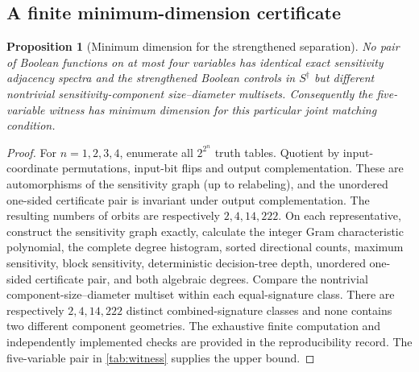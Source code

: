 \documentclass[twoside,12pt,letterpaper]{article}
\newtheorem{proposition}{Proposition}
\theoremstyle{definition}
\begin{document}
\subsection{A finite minimum-dimension certificate}
\begin{proposition}[Minimum dimension for the strengthened separation]\label{prop:minimal}
No pair of Boolean functions on at most four variables has identical exact sensitivity adjacency spectra and the strengthened Boolean controls in $S^\dagger$ but different nontrivial sensitivity-component size--diameter multisets. Consequently the five-variable witness has minimum dimension for this particular joint matching condition.
\end{proposition}
\begin{proof}
For $n=1,2,3,4$, enumerate all $2^{2^n}$ truth tables. Quotient by input-coordinate permutations, input-bit flips and output complementation. These are automorphisms of the sensitivity graph (up to relabeling), and the unordered one-sided certificate pair is invariant under output complementation. The resulting numbers of orbits are respectively $2,4,14,222$. On each representative, construct the sensitivity graph exactly, calculate the integer Gram characteristic polynomial, the complete degree histogram, sorted directional counts, maximum sensitivity, block sensitivity, deterministic decision-tree depth, unordered one-sided certificate pair, and both algebraic degrees. Compare the nontrivial component-size--diameter multiset within each equal-signature class. There are respectively $2,4,14,222$ distinct combined-signature classes and none contains two different component geometries. The exhaustive finite computation and independently implemented checks are provided in the reproducibility record. The five-variable pair in \cref{tab:witness} supplies the upper bound.
\end{proof}
\end{document}

